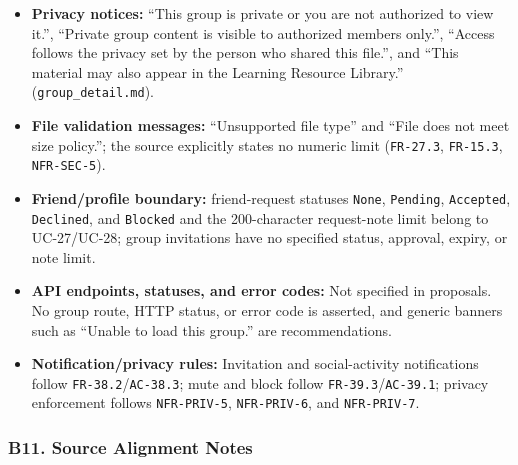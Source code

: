 \documentclass[12pt]{article}
\begin{document}
\begin{itemize}
\item \textbf{Privacy notices:} “This group is private or you are not authorized to view it.”, “Private group content is visible to authorized members only.”, “Access follows the privacy set by the person who shared this file.”, and “This material may also appear in the Learning Resource Library.” (\texttt{group\_detail.md}).
\item \textbf{File validation messages:} “Unsupported file type” and “File does not meet size policy.”; the source explicitly states no numeric limit (\texttt{FR-27.3}, \texttt{FR-15.3}, \texttt{NFR-SEC-5}).
\item \textbf{Friend/profile boundary:} friend-request statuses \texttt{None}, \texttt{Pending}, \texttt{Accepted}, \texttt{Declined}, and \texttt{Blocked} and the 200-character request-note limit belong to UC-27/UC-28; group invitations have no specified status, approval, expiry, or note limit.
\item \textbf{API endpoints, statuses, and error codes:} Not specified in proposals. No group route, HTTP status, or error code is asserted, and generic banners such as “Unable to load this group.” are recommendations.
\item \textbf{Notification/privacy rules:} Invitation and social-activity notifications follow \texttt{FR-38.2}/\texttt{AC-38.3}; mute and block follow \texttt{FR-39.3}/\texttt{AC-39.1}; privacy enforcement follows \texttt{NFR-PRIV-5}, \texttt{NFR-PRIV-6}, and \texttt{NFR-PRIV-7}.
\end{itemize}
\par\medskip

\hypertarget{sec:b11-source-alignment-notes}{}
\subsubsection*{B11. Source Alignment Notes}
\par\medskip
\end{document}
